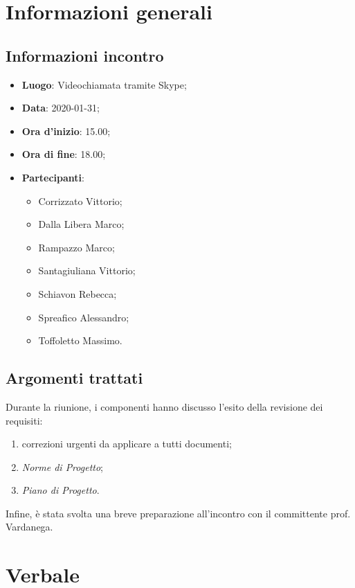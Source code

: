 \section{Informazioni generali}
    \subsection{Informazioni incontro}
        \begin{itemize}
            \item \textbf{Luogo}: Videochiamata tramite Skype;
            \item \textbf{Data}: 2020-01-31;
            \item \textbf{Ora d'inizio}: 15.00;
            \item \textbf{Ora di fine}: 18.00;
            \item \textbf{Partecipanti}: \begin{itemize}
                \item Corrizzato Vittorio;
                \item Dalla Libera Marco;
                \item Rampazzo Marco;
                \item Santagiuliana Vittorio;
                \item Schiavon Rebecca;
                \item Spreafico Alessandro;
                \item Toffoletto Massimo.
            \end{itemize}
        \end{itemize}
    \subsection{Argomenti trattati}
        Durante la riunione, i componenti hanno discusso l'esito della revisione dei requisiti:
        \begin{enumerate}
            \item correzioni urgenti da applicare a tutti documenti;
            \item \textit{Norme di Progetto};
            \item \textit{Piano di Progetto}.
        \end{enumerate}
        Infine, è stata svolta una breve preparazione all'incontro con il committente prof. Vardanega.
\section{Verbale}
